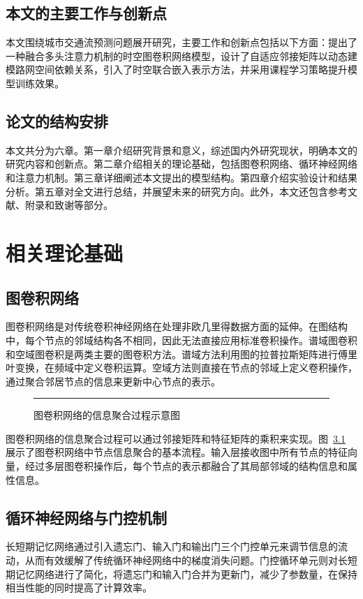 \documentclass[12pt,a4paper,twoside]{ctexbook}
\begin{document}
\section{本文的主要工作与创新点}
本文围绕城市交通流预测问题展开研究，主要工作和创新点包括以下方面：提出了一种融合多头注意力机制的时空图卷积网络模型，设计了自适应邻接矩阵以动态建模路网空间依赖关系，引入了时空联合嵌入表示方法，并采用课程学习策略提升模型训练效果。

\section{论文的结构安排}
本文共分为六章。第一章介绍研究背景和意义，综述国内外研究现状，明确本文的研究内容和创新点。第二章介绍相关的理论基础，包括图卷积网络、循环神经网络和注意力机制。第三章详细阐述本文提出的模型结构。第四章介绍实验设计和结果分析。第五章对全文进行总结，并展望未来的研究方向。此外，本文还包含参考文献、附录和致谢等部分。

\chapter{相关理论基础}
\section{图卷积网络}
图卷积网络是对传统卷积神经网络在处理非欧几里得数据方面的延伸。在图结构中，每个节点的邻域结构各不相同，因此无法直接应用标准卷积操作。谱域图卷积和空域图卷积是两类主要的图卷积方法。谱域方法利用图的拉普拉斯矩阵进行傅里叶变换，在频域中定义卷积运算。空域方法则直接在节点的邻域上定义卷积操作，通过聚合邻居节点的信息来更新中心节点的表示。

\begin{figure}[htbp]
\centering
\rule{0.75\textwidth}{4cm}
\caption{图卷积网络的信息聚合过程示意图}
\label{fig:gcn}
\end{figure}

图卷积网络的信息聚合过程可以通过邻接矩阵和特征矩阵的乘积来实现。图~\ref{fig:gcn} 展示了图卷积网络中节点信息聚合的基本流程。输入层接收图中所有节点的特征向量，经过多层图卷积操作后，每个节点的表示都融合了其局部邻域的结构信息和属性信息。

\section{循环神经网络与门控机制}
长短期记忆网络通过引入遗忘门、输入门和输出门三个门控单元来调节信息的流动，从而有效缓解了传统循环神经网络中的梯度消失问题。门控循环单元则对长短期记忆网络进行了简化，将遗忘门和输入门合并为更新门，减少了参数量，在保持相当性能的同时提高了计算效率。
\end{document}
